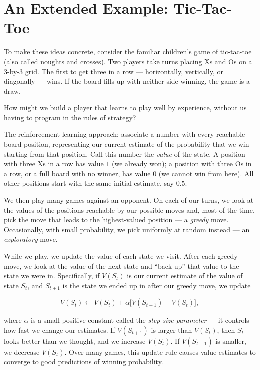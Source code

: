 \documentclass[../../book.tex]{subfiles}
\begin{document}
\section{An Extended Example: Tic-Tac-Toe}

To make these ideas concrete, consider the familiar children's game of tic-tac-toe (also called noughts and crosses).  Two players take turns placing Xs and Os on a 3-by-3 grid.  The first to get three in a row --- horizontally, vertically, or diagonally --- wins.  If the board fills up with neither side winning, the game is a draw.

How might we build a player that learns to play well by experience, without us having to program in the rules of strategy?

The reinforcement-learning approach: associate a number with every reachable board position, representing our current estimate of the probability that we win starting from that position.  Call this number the \emph{value} of the state.  A position with three Xs in a row has value $1$ (we already won); a position with three Os in a row, or a full board with no winner, has value $0$ (we cannot win from here).  All other positions start with the same initial estimate, say $0.5$.

We then play many games against an opponent.  On each of our turns, we look at the values of the positions reachable by our possible moves and, most of the time, pick the move that leads to the highest-valued position --- a \emph{greedy} move.  Occasionally, with small probability, we pick uniformly at random instead --- an \emph{exploratory} move.

While we play, we update the value of each state we visit.  After each greedy move, we look at the value of the next state and ``back up'' that value to the state we were in.  Specifically, if $V(S_t)$ is our current estimate of the value of state $S_t$, and $S_{t+1}$ is the state we ended up in after our greedy move, we update

\begin{equation*}
    V(S_t) \leftarrow V(S_t) + \alpha \big[ V(S_{t+1}) - V(S_t) \big],
\end{equation*}

where $\alpha$ is a small positive constant called the \emph{step-size parameter} --- it controls how fast we change our estimates.  If $V(S_{t+1})$ is larger than $V(S_t)$, then $S_t$ looks better than we thought, and we increase $V(S_t)$.  If $V(S_{t+1})$ is smaller, we decrease $V(S_t)$.  Over many games, this update rule causes value estimates to converge to good predictions of winning probability.
\end{document}
